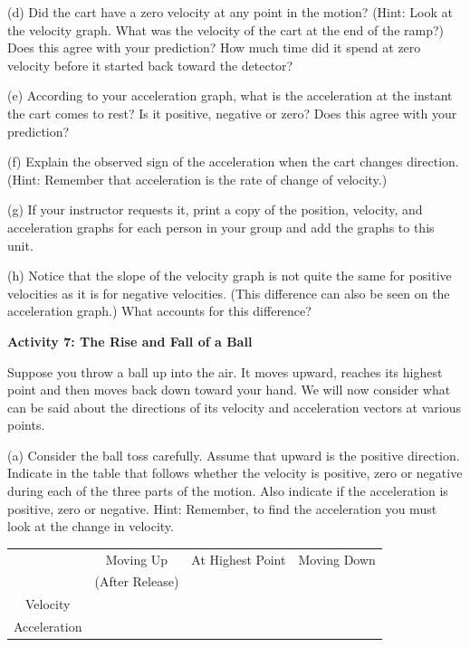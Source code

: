 \pagebreak[2]
(d) Did the cart have a zero velocity at any point in the motion? (Hint: Look
at the velocity graph. What was the velocity of the cart at the end of the ramp?)
Does this agree with your prediction? How much time did it spend at zero velocity
before it started back toward the detector?
\answerspace{20mm}

(e) According to your acceleration graph, what is the acceleration at the instant
the cart comes to rest? Is it positive, negative or zero? Does this agree with
your prediction? 
\answerspace{20mm}

(f) Explain the observed sign of the acceleration when the cart changes direction. (Hint: Remember that acceleration is the rate of change of velocity.) 
\answerspace{20mm}

(g) If your instructor requests it, print a copy of the position, velocity, and acceleration graphs for each person in your group and add the graphs to this unit.

(h) Notice that the slope of the velocity graph is not quite the same for positive velocities as it is for negative velocities. (This difference can also be seen on the acceleration graph.) What accounts for this difference?
\answerspace{20mm}

\textbf{Activity 7: The Rise and Fall of a Ball} 

Suppose you throw a ball up into the air. It moves upward, reaches its highest
point and then moves back down toward your hand. We will now consider what can be said about the directions of its velocity and acceleration vectors at various points.

(a) Consider the ball toss carefully. Assume that upward is the positive direction.
Indicate in the table that follows whether the velocity is positive, zero or
negative during each of the three parts of the motion. Also indicate if the
acceleration is positive, zero or negative. Hint: Remember, to find the acceleration
you must look at the change in velocity.

\vspace{0.3cm}
{\centering \begin{tabular}{|c|c|c|c|}
\hline 
&
Moving Up&
At Highest Point&
Moving Down\\
&
(After Release)&
&
\\
\hline 
Velocity&
&
&
\\
\hline 
Acceleration&
&
&
\\
\hline 
\end{tabular}\par}
\vspace{0.3cm}

